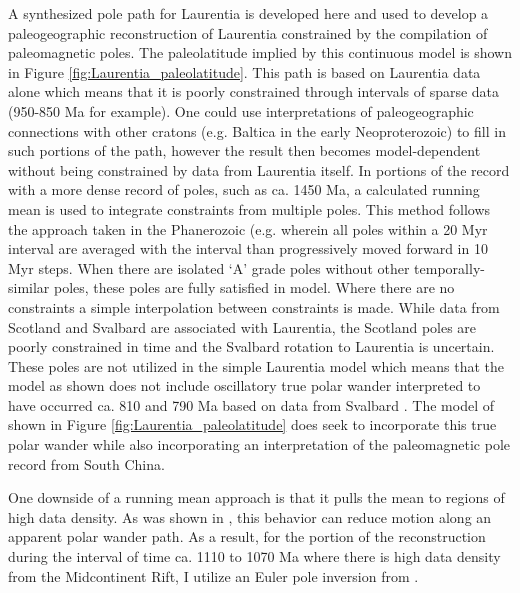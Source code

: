 \documentclass[11pt,letterpaper]{article}
\begin{document}
A synthesized pole path for Laurentia is developed here and used to develop a paleogeographic reconstruction of Laurentia constrained by the compilation of paleomagnetic poles. The paleolatitude implied by this continuous model is shown in Figure \ref{fig:Laurentia_paleolatitude}. This path is based on Laurentia data alone which means that it is poorly constrained through intervals of sparse data (950-850 Ma for example). One could use interpretations of paleogeographic connections with other cratons (e.g. Baltica in the early Neoproterozoic) to fill in such portions of the path, however the result then becomes model-dependent without being constrained by data from Laurentia itself. In portions of the record with a more dense record of poles, such as ca. 1450 Ma, a calculated running mean is used to integrate constraints from multiple poles. This method follows the approach taken in the Phanerozoic (e.g. \citealp{Torsvik2012a} wherein all poles within a 20 Myr interval are averaged with the interval than progressively moved forward in 10 Myr steps. When there are isolated `A' grade poles without other temporally-similar poles, these poles are fully satisfied in model. Where there are no constraints a simple interpolation between constraints is made. While data from Scotland and Svalbard are associated with Laurentia, the Scotland poles are poorly constrained in time and the Svalbard rotation to Laurentia is uncertain. These poles are not utilized in the simple Laurentia model which means that the model as shown does not include oscillatory true polar wander interpreted to have occurred ca. 810 and 790 Ma based on data from Svalbard \citep{Maloof2006a}. The model of \cite{Li2013a} shown in Figure \ref{fig:Laurentia_paleolatitude} does seek to incorporate this true polar wander while also incorporating an interpretation of the paleomagnetic pole record from South China. 

One downside of a running mean approach is that it pulls the mean to regions of high data density. As was shown in \cite{Swanson-Hysell2019a}, this behavior can reduce motion along an apparent polar wander path. As a result, for the portion of the reconstruction during the interval of time ca. 1110 to 1070 Ma where there is high data density from the Midcontinent Rift, I utilize an Euler pole inversion from \cite{Swanson-Hysell2019a}.
\end{document}
